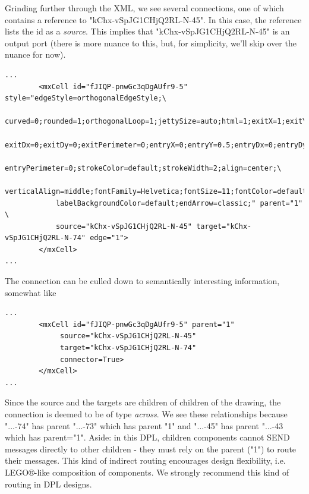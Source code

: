 \documentclass[10pt,anonymous,review]{acmart}
\begin{document}
Grinding further through the XML, we see several connections, one of which contains a reference to "kChx-vSpJG1CHjQ2RL-N-45". In this case, the reference lists the id as a \emph{source}. This implies that "kChx-vSpJG1CHjQ2RL-N-45" is an output port (there is more nuance to this, but, for simplicity, we'll skip over the nuance for now).
\begin{verbatim}
...
        <mxCell id="fJIQP-pnwGc3qDgAUfr9-5" style="edgeStyle=orthogonalEdgeStyle;\
            curved=0;rounded=1;orthogonalLoop=1;jettySize=auto;html=1;exitX=1;exitY=0.5;\
            exitDx=0;exitDy=0;exitPerimeter=0;entryX=0;entryY=0.5;entryDx=0;entryDy=0;\
            entryPerimeter=0;strokeColor=default;strokeWidth=2;align=center;\
            verticalAlign=middle;fontFamily=Helvetica;fontSize=11;fontColor=default;\
            labelBackgroundColor=default;endArrow=classic;" parent="1" \
            source="kChx-vSpJG1CHjQ2RL-N-45" target="kChx-vSpJG1CHjQ2RL-N-74" edge="1">
        </mxCell>
...  
\end{verbatim}
The connection can be culled down to semantically interesting information, somewhat like
\begin{verbatim}
...
        <mxCell id="fJIQP-pnwGc3qDgAUfr9-5" parent="1"
             source="kChx-vSpJG1CHjQ2RL-N-45"
             target="kChx-vSpJG1CHjQ2RL-N-74"
             connector=True>
        </mxCell>
...  
\end{verbatim}
Since the source and the targets are children of children of the drawing, the connection is deemed to be of type \emph{across}.
We see these relationships because "...-74" has parent "...-73" which has parent "1" and "...-45" has parent "...-43 which has parent="1". Aside: in this DPL, children components cannot SEND messages directly to other children - they must rely on the parent ("1") to route their messages. This kind of indirect routing encourages design flexibility, i.e. LEGO®-like composition of components. We strongly recommend this kind of routing in DPL designs.
\end{document}
